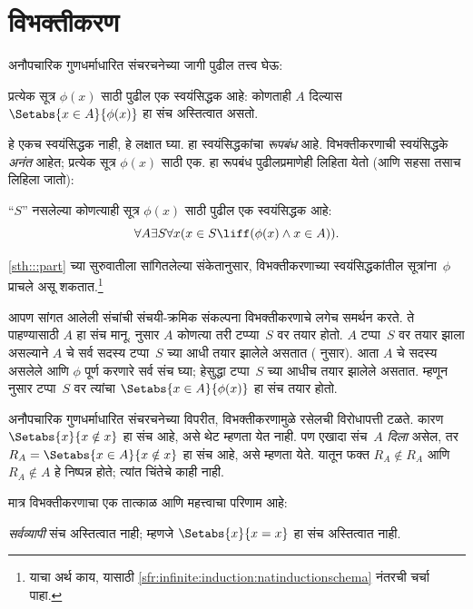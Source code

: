 \section{विभक्तीकरण}\label{sth:z:sep:sec}

अनौपचारिक गुणधर्माधारित संचरचनेच्या जागी पुढील तत्त्व घेऊ:

\begin{axiom}[विभक्तीकरण-रूपबंध] प्रत्येक सूत्र $\phi(x)$ साठी पुढील एक स्वयंसिद्धक आहे: कोणताही $A$ दिल्यास $\Setabs{x \in A}{\phi(x)}$ हा संच अस्तित्वात असतो.
\end{axiom}

हे एकच स्वयंसिद्धक नाही, हे लक्षात घ्या. हा स्वयंसिद्धकांचा \emph{रूपबंध} आहे. विभक्तीकरणाची स्वयंसिद्धके \emph{अनंत} आहेत; प्रत्येक सूत्र $\phi(x)$ साठी एक. हा रूपबंध पुढीलप्रमाणेही लिहिता येतो (आणि सहसा तसाच लिहिला जातो):

\begin{defish}
``$S$'' नसलेल्या कोणत्याही सूत्र $\phi(x)$ साठी पुढील एक स्वयंसिद्धक आहे:
\[
	\forall A \exists S \forall x(x \in S \liff (\phi(x) \land x \in A)).
\]
\end{defish}

\ref{sth:::part} च्या सुरुवातीला सांगितलेल्या संकेतानुसार, विभक्तीकरणाच्या स्वयंसिद्धकांतील सूत्रांना~$\phi$ प्राचले असू शकतात.\footnote{याचा अर्थ काय, यासाठी \ref{sfr:infinite:induction:natinductionschema} नंतरची चर्चा पाहा.}

आपण सांगत आलेली संचांची संचयी-क्रमिक संकल्पना विभक्तीकरणाचे लगेच समर्थन करते. ते पाहण्यासाठी $A$ हा संच मानू. \stageshier{} नुसार $A$ कोणत्या तरी टप्प्या~$S$ वर तयार होतो. $A$ टप्पा~$S$ वर तयार झाला असल्याने $A$ चे सर्व सदस्य टप्पा~$S$ च्या आधी तयार झालेले असतात (\stagesacc{} नुसार). आता $A$ चे सदस्य असलेले आणि $\phi$ पूर्ण करणारे सर्व संच घ्या; हेसुद्धा टप्पा~$S$ च्या आधीच तयार झालेले असतात. म्हणून \stagesacc{} नुसार टप्पा~$S$ वर त्यांचा $\Setabs{x \in A}{\phi(x)}$ हा संच तयार होतो.

अनौपचारिक गुणधर्माधारित संचरचनेच्या विपरीत, विभक्तीकरणामुळे रसेलची विरोधापत्ती टळते. कारण $\Setabs{x}{x \notin
x}$ हा संच आहे, असे थेट म्हणता येत नाही. पण एखादा संच~$A$ \emph{दिला} असेल, तर $R_A = \Setabs{x \in A}{x \notin x}$ हा संच आहे, असे म्हणता येते. यातून फक्त $R_A \notin R_A$ आणि $R_A \notin A$ हे निष्पन्न होते; त्यांत चिंतेचे काही नाही.

मात्र विभक्तीकरणाचा एक तात्काळ आणि महत्त्वाचा परिणाम आहे:

\begin{thm}\label{sth:z:sep:thm:NoUniversalSet}
\emph{सर्वव्यापी} संच अस्तित्वात नाही; म्हणजे $\Setabs{x}{x = x}$ हा संच अस्तित्वात नाही.
\end{thm}

